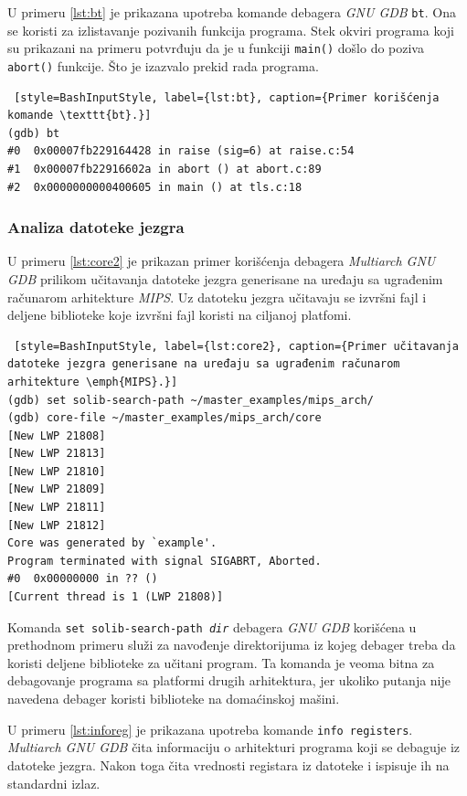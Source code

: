 \documentclass[12pt,oneside]{memoir}
\begin{document}
U primeru \ref{lst:bt} je prikazana upotreba komande debagera \emph{GNU GDB} \texttt{bt}. Ona se koristi za izlistavanje pozivanih funkcija programa. Stek okviri programa koji su prikazani na primeru potvrđuju da je u funkciji \texttt{main()} došlo do poziva \texttt{abort()} funkcije. Što je izazvalo prekid rada programa.

\begin{lstlisting} [style=BashInputStyle, label={lst:bt}, caption={Primer korišćenja komande \texttt{bt}.}]
(gdb) bt
#0  0x00007fb229164428 in raise (sig=6) at raise.c:54
#1  0x00007fb22916602a in abort () at abort.c:89
#2  0x0000000000400605 in main () at tls.c:18
\end{lstlisting}

\subsubsection{Analiza datoteke jezgra}

U primeru \ref{lst:core2} je prikazan primer korišćenja debagera \emph{Multiarch GNU GDB} prilikom učitavanja datoteke jezgra generisane na uređaju sa ugrađenim računarom arhitekture \emph{MIPS}. Uz datoteku jezgra učitavaju se izvršni fajl i deljene biblioteke koje izvršni fajl koristi na ciljanoj platfomi.


\begin{lstlisting} [style=BashInputStyle, label={lst:core2}, caption={Primer učitavanja datoteke jezgra generisane na uređaju sa ugrađenim računarom arhitekture \emph{MIPS}.}]
(gdb) set solib-search-path ~/master_examples/mips_arch/
(gdb) core-file ~/master_examples/mips_arch/core
[New LWP 21808]
[New LWP 21813]
[New LWP 21810]
[New LWP 21809]
[New LWP 21811]
[New LWP 21812]
Core was generated by `example'.
Program terminated with signal SIGABRT, Aborted.
#0  0x00000000 in ?? ()
[Current thread is 1 (LWP 21808)]
\end{lstlisting}

Komanda \texttt{set solib-search-path \emph{dir}} debagera \emph{GNU GDB} korišćena u prethodnom primeru služi za navođenje direktorijuma iz kojeg debager treba da koristi deljene biblioteke za učitani program. Ta komanda je veoma bitna za debagovanje programa sa platformi drugih arhitektura, jer ukoliko putanja nije navedena debager koristi biblioteke na domaćinskoj mašini.

U primeru \ref{lst:inforeg} je prikazana upotreba komande \texttt{info registers}. \emph{Multiarch GNU GDB} čita informaciju o arhitekturi programa koji se debaguje iz datoteke jezgra. Nakon toga čita vrednosti registara iz datoteke i ispisuje ih na standardni izlaz.\newpage
\end{document}
